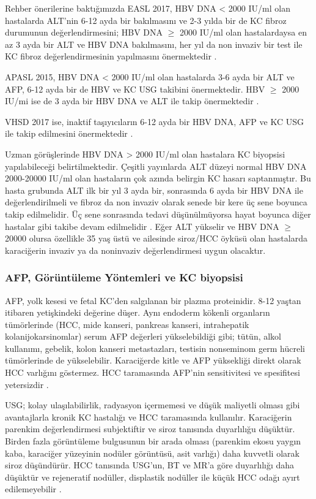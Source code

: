 Rehber önerilerine baktığımızda EASL 2017, HBV DNA < 2000 IU/ml olan hastalarda ALT'nin 6-12 ayda bir bakılmasını ve 2-3 yılda bir de KC fibroz durumunun değerlendirmesini; HBV DNA $ \geq $ 2000 IU/ml olan hastalardaysa en az 3 ayda bir ALT ve HBV DNA bakılmasını, her yıl da non invaziv bir test ile KC fibroz değerlendirmesinin yapılmasını önermektedir \cite{european2017easl}.

APASL 2015, HBV DNA < 2000 IU/ml olan hastalarda 3-6 ayda bir ALT ve AFP, 6-12 ayda bir de HBV ve KC USG takibini önermektedir. HBV $ \geq $ 2000 IU/mi ise de 3 ayda bir  HBV DNA ve ALT ile takip önermektedir \cite{sarin2016asian}. 

VHSD 2017 ise, inaktif taşıyıcıların 6-12 ayda bir HBV DNA, AFP ve KC USG ile takip edilmesini önermektedir \cite{vhsd2017}.  

Uzman görüşlerinde HBV DNA > 2000 IU/ml olan hastalara KC biyopsisi yapılabileceği belirtilmektedir. Çeşitli yayınlarda ALT düzeyi normal HBV DNA 2000-20000 IU/ml olan hastaların çok azında belirgin KC hasarı saptanmıştır. Bu hasta grubunda ALT ilk bir yıl 3 ayda bir, sonrasında 6 ayda bir HBV DNA ile değerlendirilmeli ve fibroz da non invaziv olarak senede bir kere üç sene boyunca takip edilmelidir. Üç sene sonrasında tedavi düşünülmüyorsa hayat boyunca diğer hastalar gibi takibe devam edilmelidir \cite{papatheodoridis2012follow}. Eğer ALT yükselir ve HBV DNA $ \geq $ 20000 olursa özellikle 35 yaş üstü ve ailesinde siroz/HCC öyküsü olan hastalarda karaciğerin invaziv ya da noninvaziv değerlendirmesi uygun olacaktır. 

\subsubsection{AFP, Görüntüleme Yöntemleri ve KC biyopsisi}

AFP, yolk kesesi ve fetal KC'den salgılanan bir plazma proteinidir. 8-12 yaştan itibaren yetişkindeki değerine düşer. Aynı endoderm kökenli organların tümörlerinde (HCC, mide kanseri, pankreas kanseri, intrahepatik kolanijokarsinomlar) serum AFP değerleri yükselebildiği gibi; tütün, alkol kullanımı, gebelik, kolon kanseri metastazları, testisin nonseminom germ hücreli tümörlerinde de yükselebilir. Karaciğerde kitle ve AFP yüksekliği direkt olarak HCC varlığını göstermez. HCC taramasında AFP'nin sensitivitesi ve spesifitesi yetersizdir \cite{bruix2011management}.


USG; kolay ulaşılabilirlik, radyasyon içermemesi ve düşük maliyetli olması gibi avantajlarla kronik KC hastalığı ve HCC taramasında kullanılır. Karaciğerin parenkim değerlendirmesi subjektiftir ve siroz tanısında duyarlılığu düşüktür. Birden fazla görüntüleme bulgusunun bir arada olması (parenkim ekosu yaygın kaba, karaciğer yüzeyinin nodüler görüntüsü, asit varlığı) daha kuvvetli olarak siroz düşündürür. HCC tanısında USG'un, BT ve MR'a göre duyarlılığı daha düşüktür ve rejeneratif nodüller, displastik nodüller ile küçük HCC odağı ayırt edilemeyebilir \cite{arif2014mri}.

